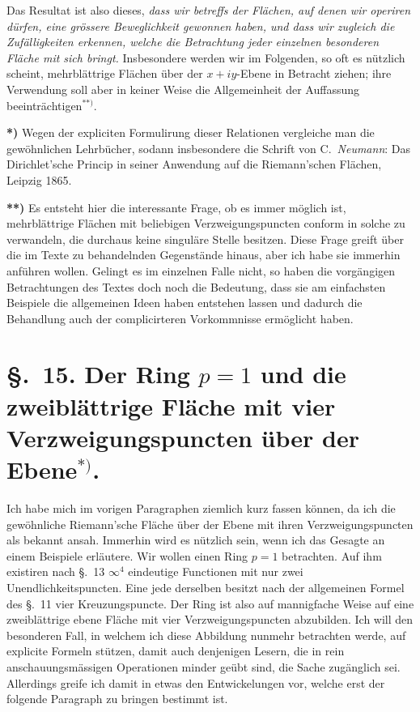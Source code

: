 \documentclass{article}
\begin{document}
Das Resultat ist also dieses, \emph{dass wir betreffs der Flächen, auf denen wir operiren dürfen, eine grössere Beweglichkeit gewonnen haben, und dass wir zugleich die Zufälligkeiten erkennen, welche die Betrachtung jeder einzelnen besonderen Fläche mit sich bringt.} Insbesondere werden wir im Folgenden, so oft es nützlich scheint, mehrblättrige Flächen über der $x + iy$-Ebene in Betracht ziehen; ihre Verwendung soll aber in keiner Weise die Allgemeinheit der Auffassung beeinträchtigen${}^{**)}$.

\textbf{*)} Wegen der expliciten Formulirung dieser Relationen vergleiche man die gewöhnlichen Lehrbücher, sodann insbesondere die Schrift von C.\ \emph{Neumann}: Das Dirichlet'sche Princip in seiner Anwendung auf die Riemann'schen Flächen, Leipzig 1865.

\textbf{**)} Es entsteht hier die interessante Frage, ob es immer möglich ist, mehrblättrige Flächen mit beliebigen Verzweigungspuncten conform in solche zu verwandeln, die durchaus keine singuläre Stelle besitzen. Diese Frage greift über die im Texte zu behandelnden Gegenstände hinaus, aber ich habe sie immerhin anführen wollen. Gelingt es im einzelnen Falle nicht, so haben die vorgängigen Betrachtungen des Textes doch noch die Bedeutung, dass sie am einfachsten Beispiele die allgemeinen Ideen haben entstehen lassen und dadurch die Behandlung auch der complicirteren Vorkommnisse ermöglicht haben.


\section*{§.~15. Der Ring $p = 1$ und die zweiblättrige Fläche mit vier Verzweigungspuncten über der Ebene${}^{*)}$.}

Ich habe mich im vorigen Paragraphen ziemlich kurz fassen können, da ich die gewöhnliche Riemann'sche Fläche über der Ebene mit ihren Verzweigungspuncten als bekannt ansah. Immerhin wird es nützlich sein, wenn ich das Gesagte an einem Beispiele erläutere. Wir wollen einen Ring $p = 1$ betrachten. Auf ihm existiren nach §.~13 $\infty^{4}$ eindeutige Functionen mit nur zwei Unendlichkeitspuncten. Eine jede derselben besitzt nach der allgemeinen Formel des §.~11 vier Kreuzungspuncte. Der Ring ist also auf mannigfache Weise auf eine zweiblättrige ebene Fläche mit vier Verzweigungspuncten abzubilden. Ich will den besonderen Fall, in welchem ich diese Abbildung nunmehr betrachten werde, auf explicite Formeln stützen, damit auch denjenigen Lesern, die in rein anschauungsmässigen Operationen minder geübt sind, die Sache zugänglich sei. Allerdings greife ich damit in etwas den Entwickelungen vor, welche erst der folgende Paragraph zu bringen bestimmt ist.
\end{document}
